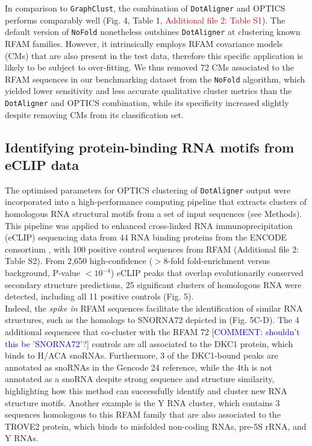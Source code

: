 \documentclass{bmcart}
\newcommand\dotaligner{\texttt{DotAligner}}
\begin{document}
In comparison to \texttt{GraphClust},  the combination of \dotaligner{} and OPTICS performs comparably well (Fig. 4, Table 1, \textcolor{red}{Additional file 2: Table S1}). 
The default version of \texttt{NoFold} nonetheless outshines \dotaligner{} at clustering known RFAM families. 
However, it intrinsically employs RFAM covariance models (CMs) that are also present in the test data, 
therefore this specific application is likely to be subject to over-fitting. 
We thus removed 72 CMs associated to the RFAM sequences in our benchmarking 
dataset from the \texttt{NoFold} algorithm, which yielded lower sensitivity and 
less accurate qualitative cluster metrics than the \dotaligner{} and OPTICS combination, while 
its specificity increased slightly despite removing CMs from its classification set. 


\subsection*{Identifying protein-binding RNA motifs from eCLIP data}
The optimised parameters for OPTICS clustering of \dotaligner{} output were incorporated into 
a high-performance computing pipeline that extracts clusters of homologous RNA structural
 motifs from a set of input sequences (see Methods).  This pipeline was applied to enhanced cross-linked 
RNA immunoprecipitation (eCLIP) sequencing data from 44 RNA binding proteins from the ENCODE consortium  \cite{van2016robust}, with 100 positive control sequences from RFAM (Additional file 2: Table S2).
From 2,650 high-confidence ($>$8-fold  fold-enrichment versus background, P-value $<10^{-4}$) eCLIP peaks 
that overlap evolutionarily conserved secondary structure predictions, 
25 significant clusters of homologous RNA were detected, including all 11 positive controls (Fig. 5).\\

Indeed, the \textit{spike in} RFAM sequences facilitate the identification of similar RNA structures, 
such as the homologs to SNORNA72 depicted in (Fig. 5C-D). The 4 additional sequences that 
co-cluster with the RFAM 72 \textcolor{blue} {[COMMENT: shouldn't this be 'SNORNA72'?]} controls are all associated to the DKC1 protein, which binds to H/ACA snoRNAs. 
Furthermore, 3 of the DKC1-bound peaks are annotated as snoRNAs in the Gencode 24 reference, 
while the 4th is not annotated as a snoRNA despite strong sequence and structure similarity, 
highlighting how this method can successfully identify and cluster new RNA structure motifs. 
Another example is the Y RNA cluster, which contains 3 sequences homologous to this RFAM family 
that are also associated to the TROVE2 protein, which binds to misfolded non-coding RNAs, 
pre-5S rRNA, and Y RNAs.\\
\end{document}
